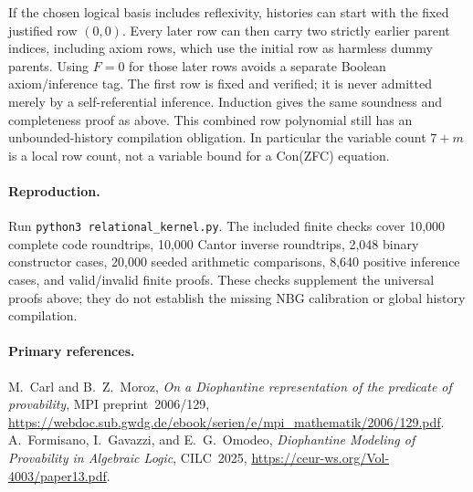 If the chosen logical basis includes reflexivity, histories can start
with the fixed justified row $(0,0)$.  Every later row can then carry two
strictly earlier parent indices, including axiom rows, which use the
initial row as harmless dummy parents.  Using $F=0$ for those later rows
avoids a separate Boolean axiom/inference tag.  The first row is fixed
and verified; it is never admitted merely by a self-referential
inference.  Induction gives the same soundness and completeness proof
as above.  This combined row polynomial still has an unbounded-history
compilation obligation.  In particular the variable count $7+m$ is a
local row count, not a variable bound for a Con(ZFC) equation.

\paragraph{Reproduction.}
Run \texttt{python3 relational\_kernel.py}.  The included finite checks
cover 10,000 complete code roundtrips, 10,000 Cantor inverse roundtrips,
2,048 binary constructor cases, 20,000 seeded arithmetic comparisons,
8,640 positive inference cases, and valid/invalid finite proofs.  These
checks supplement the universal proofs above; they do not establish the
missing NBG calibration or global history compilation.

\paragraph{Primary references.}
M.~Carl and B.~Z.~Moroz, \emph{On a Diophantine representation of the
predicate of provability}, MPI preprint~2006/129,
\url{https://webdoc.sub.gwdg.de/ebook/serien/e/mpi_mathematik/2006/129.pdf}.
A.~Formisano, I.~Gavazzi, and E.~G.~Omodeo,
\emph{Diophantine Modeling of Provability in Algebraic Logic}, CILC~2025,
\url{https://ceur-ws.org/Vol-4003/paper13.pdf}.
